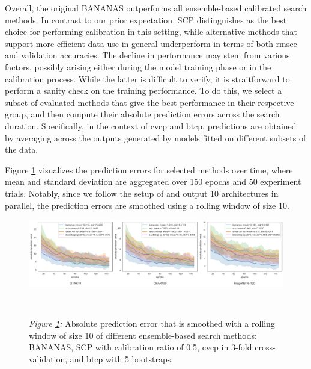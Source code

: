 \documentclass[a4paper,oneside,bibliography=totoc]{scrbook}
\begin{document}
\begin{description}[leftmargin=0cm, listparindent=\parindent]
	\item[Prediction Error Analysis:] Overall, the original BANANAS outperforms all ensemble-based calibrated search methods. In contrast to our prior expectation, SCP distinguishes as the best choice for performing calibration in this setting, while alternative methods that support more efficient data use	in general underperform in terms of both \gls{rmsce} and validation accuracies. The decline in performance may stem from various factors, possibly arising   either during the model training phase or in the calibration process. While the latter is difficult to verify, it is straitforward to perform a sanity check on the training performance. To do this, we select a subset of evaluated methods that give the best performance in their respective group, and then compute their absolute prediction errors across the search duration. Specifically, in the context of \gls{cvcp} and \gls{btcp}, predictions are obtained by averaging across the outputs generated by models fitted on different subsets of the data. 
	
	 Figure \ref{fig: pred_err} visualizes the prediction errors for selected methods over time, where mean and standard deviation are aggregated over 150 epochs and 50 experiment trials. Notably, since we follow the setup of \cite{white2019bananas} and output 10 architectures in parallel, the prediction errors are smoothed using a rolling window of size 10.
	
		\vspace{0.7em}
		\begin{figure}[H]
			\centering
			\includegraphics[scale=0.39 ]{figs/prediction_error_ensemble.png}
			\label{fig: pred_err}
			\\
 			\parbox{\linewidth}{
			\vspace{0.2em}
 	  			{\small \textit{Figure \ref{fig: pred_err}:} Absolute prediction error that is smoothed with a rolling window of size 10 of different ensemble-based search methods: BANANAS, SCP with calibration ratio of 0.5, \gls{cvcp} in 3-fold cross-validation, and \gls{btcp} with 5 bootstraps.}
 	 		}	
		\end{figure}	
		\vspace{0.2em}


\end{description}
\end{document}
